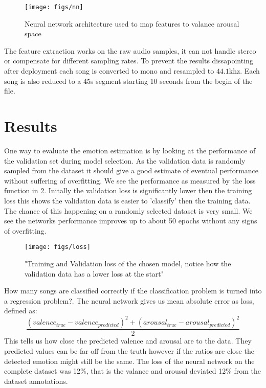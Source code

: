 \documentclass[lang=en, hanging-titles=true]{skrapport}
\begin{document}
\begin{figure}[h]
	\centering
	\texttt{[image: figs/nn]}
	\caption{Neural network architecture used to map features to valance arousal space}
	\label{fig:nn}
\end{figure}

The feature extraction works on the raw audio samples, it can not handle stereo or compensate for different sampling rates. To prevent the results dissapointing after deployment each song is converted to mono and resampled to $44.1$khz. Each song is also reduced to a 45s segment starting 10 seconds from the begin of the file.

\section{Results}
One way to evaluate the emotion estimation is by looking at the performance of the validation set during model selection. As the validation data is randomly sampled from the dataset it should give a good estimate of eventual performance without suffering of overfitting. We see the performance as measured by the loss function in \cref{fig:loss}. Initally the validation loss is significantly lower then the training loss this shows the validation data is easier to 'classify' then the training data. The chance of this happening on a randomly selected dataset is very small. We see the networks performance improves up to about 50 epochs without any signs of overfitting. 

\begin{figure}[htbp]
	\centering
	\texttt{[image: figs/loss]}
	\caption{"Training and Validation loss of the chosen model, notice how the validation data has a lower loss at the start"}
	\label{fig:loss}
\end{figure}

How many songs are classified correctly if the classification problem is turned into a regression problem?. The neural network gives us mean absolute error as loss, defined as: 
\begin{equation*}
	\frac{(valence_{true} - valence_{predicted})^2 + (arousal_{true} - arousal_{predicted})^2}{2}
\end{equation*}
This tells us how close the predicted valence and arousal are to the data. They predicted values can be far off from the truth however if the ratios are close the detected emotion might still be the same. The loss of the neural network on the complete dataset was 12\%, that is the valance and arousal deviated 12\% from the dataset annotations.
\end{document}
